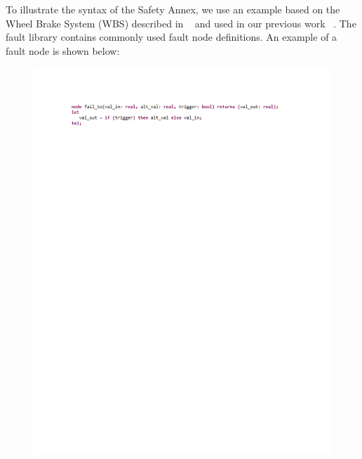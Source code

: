To illustrate the syntax of the Safety Annex, we use an example based on the Wheel Brake System (WBS) described in ~\cite{AIR6110} and used in our previous work ~\cite{Stewart17:IMBSA}.
The fault library contains commonly used fault node definitions. An example of a fault node is shown below:
\begin{figure}[h!]
	\hspace*{-4cm}
	\vspace{-0.5in} 
	\begin{center}
		\includegraphics[trim=0 670 -10 70,clip,width=1.3\dimexpr\textwidth-1.5cm\relax]{images/fault_node.pdf}
	\end{center}
	\vspace{-0.4in}
\end{figure}

